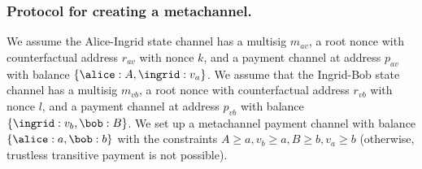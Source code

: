 \documentclass[prb,floatfix,reprint,nofootinbib,amsmath,amssymb,epsfig,pre,floats,letterpaper,groupedaffiliation,tightenlines,allcolors=blue,11pt]{revtex4}
\theoremstyle{definition}
\theoremstyle{definition}
\theoremstyle{definition}
\begin{document}
\subsubsection{Protocol for creating a metachannel.}

We assume the Alice-Ingrid state channel has a multisig $m_{av}$, a root nonce with counterfactual address $r_{av}$ with nonce $k$, and a payment channel at address $p_{av}$ with balance $\{ \alice: A, \ingrid: v_a \}$. We assume that the Ingrid-Bob state channel has a multisig $m_{vb}$, a root nonce with counterfactual address $r_{vb}$ with nonce $l$, and a payment channel at address $p_{vb}$ with balance $\{ \ingrid: v_b, \bob: B\}$. We set up a metachannel payment channel with balance $\{ \alice: a, \bob: b \}$ with the constraints $A \ge a, v_b \ge a, B \ge b, v_a \ge b$ (otherwise, trustless transitive payment is not possible).
\end{document}
